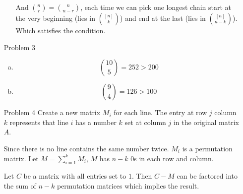 \documentclass{article}
\begin{document}
\begin{itemize}
\begin{enumerate}[(a)]
                And ${n \choose r} = {n \choose n - r}$, each time we
                can pick one longest chain start at the very beginning
                (lies in ${[n] \choose k}$) and end at the last
                (lies in ${[n] \choose n-k}$). Which satisfies the 
                condition.
        \end{enumerate}

    \item[Problem 3]
        \begin{enumerate}[(a)]
            \item $${10 \choose 5} = 252 > 200$$
            \item $${9 \choose 4} = 126 > 100$$
        \end{enumerate}

    \item[Problem 4]
        Create a new matrix $M_i$ for each line. The entry at row $j$
        column $k$ represents that line $i$ has a number $k$ set at
        column $j$ in the original matrix $A$.

        Since there is no line contains the same number twice. $M_i$
        is a permutation matrix. Let $M = \sum_{i=1}^{k} M_i$,
        $M$ has $n - k$ 0s in each row and column.

        Let $C$ be a matrix with all entries set to $1$.
        Then $C - M$ can be factored into the sum of
        $n - k$ permutation matrices which implies the result.

\end{itemize}
\end{document}
